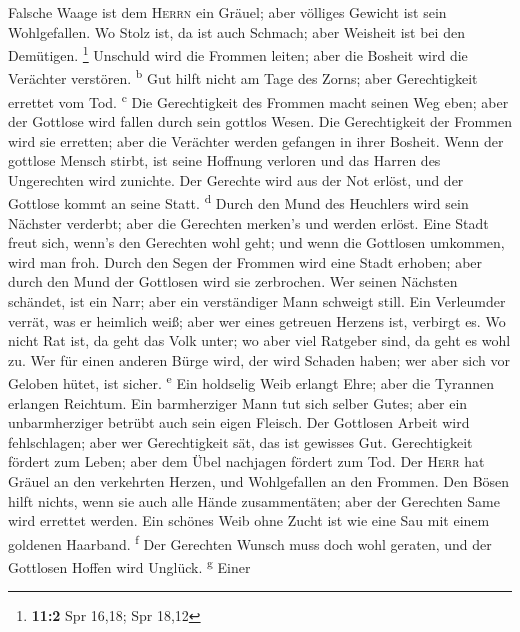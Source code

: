 Falsche Waage ist dem \textsc{Herrn} ein Gräuel; aber
völliges Gewicht ist sein Wohlgefallen.  Wo Stolz ist, da
ist auch Schmach; aber Weisheit ist bei den Demütigen. \footnote{\textbf{11:2}
  Spr 16,18; Spr 18,12}  Unschuld wird die Frommen leiten;
aber die Bosheit wird die Verächter verstören. \textsuperscript{b}
 Gut hilft nicht am Tage des Zorns; aber Gerechtigkeit
errettet vom Tod. \textsuperscript{c}  Die Gerechtigkeit
des Frommen macht seinen Weg eben; aber der Gottlose wird fallen durch
sein gottlos Wesen.  Die Gerechtigkeit der Frommen wird
sie erretten; aber die Verächter werden gefangen in ihrer Bosheit.
 Wenn der gottlose Mensch stirbt, ist seine Hoffnung
verloren und das Harren des Ungerechten wird zunichte. 
Der Gerechte wird aus der Not erlöst, und der Gottlose kommt an seine
Statt. \textsuperscript{d}  Durch den Mund des Heuchlers
wird sein Nächster verderbt; aber die Gerechten merken's und werden
erlöst.  Eine Stadt freut sich, wenn's den Gerechten wohl
geht; und wenn die Gottlosen umkommen, wird man froh. 
Durch den Segen der Frommen wird eine Stadt erhoben; aber durch den Mund
der Gottlosen wird sie zerbrochen.  Wer seinen Nächsten
schändet, ist ein Narr; aber ein verständiger Mann schweigt still.
 Ein Verleumder verrät, was er heimlich weiß; aber wer
eines getreuen Herzens ist, verbirgt es.  Wo nicht Rat
ist, da geht das Volk unter; wo aber viel Ratgeber sind, da geht es wohl
zu.  Wer für einen anderen Bürge wird, der wird Schaden
haben; wer aber sich vor Geloben hütet, ist sicher. \textsuperscript{e}
 Ein holdselig Weib erlangt Ehre; aber die Tyrannen
erlangen Reichtum.  Ein barmherziger Mann tut sich selber
Gutes; aber ein unbarmherziger betrübt auch sein eigen Fleisch.
 Der Gottlosen Arbeit wird fehlschlagen; aber wer
Gerechtigkeit sät, das ist gewisses Gut.  Gerechtigkeit
fördert zum Leben; aber dem Übel nachjagen fördert zum Tod.
 Der \textsc{Herr} hat Gräuel an den verkehrten Herzen,
und Wohlgefallen an den Frommen.  Den Bösen hilft nichts,
wenn sie auch alle Hände zusammentäten; aber der Gerechten Same wird
errettet werden.  Ein schönes Weib ohne Zucht ist wie
eine Sau mit einem goldenen Haarband. \textsuperscript{f}
 Der Gerechten Wunsch muss doch wohl geraten, und der
Gottlosen Hoffen wird Unglück. \textsuperscript{g}  Einer
